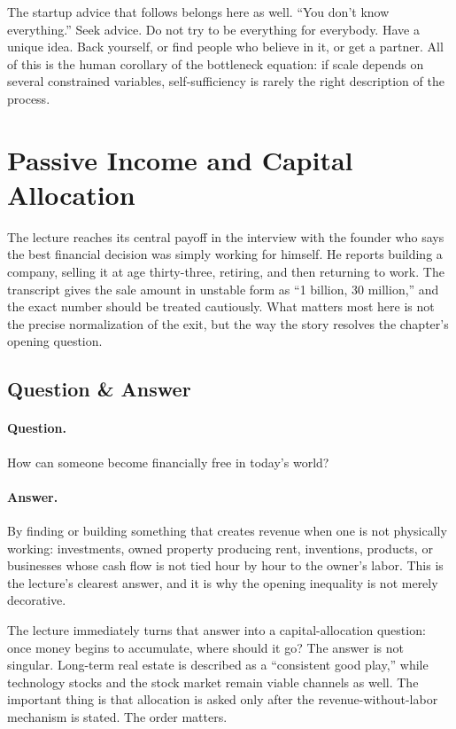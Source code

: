 The startup advice that follows belongs here as well. ``You don't know everything.'' Seek advice. Do not try to be everything for everybody. Have a unique idea. Back yourself, or find people who believe in it, or get a partner. All of this is the human corollary of the bottleneck equation: if scale depends on several constrained variables, self-sufficiency is rarely the right description of the process.

\section{Passive Income and Capital Allocation}

The lecture reaches its central payoff in the interview with the founder who says the best financial decision was simply working for himself. He reports building a company, selling it at age thirty-three, retiring, and then returning to work. The transcript gives the sale amount in unstable form as ``1 billion, 30 million,'' and the exact number should be treated cautiously. What matters most here is not the precise normalization of the exit, but the way the story resolves the chapter's opening question.

\subsection{Question \& Answer}

\paragraph{Question.}
How can someone become financially free in today's world?

\paragraph{Answer.}
By finding or building something that creates revenue when one is not physically working: investments, owned property producing rent, inventions, products, or businesses whose cash flow is not tied hour by hour to the owner's labor. This is the lecture's clearest answer, and it is why the opening inequality is not merely decorative.

The lecture immediately turns that answer into a capital-allocation question: once money begins to accumulate, where should it go? The answer is not singular. Long-term real estate is described as a ``consistent good play,'' while technology stocks and the stock market remain viable channels as well. The important thing is that allocation is asked only after the revenue-without-labor mechanism is stated. The order matters.

